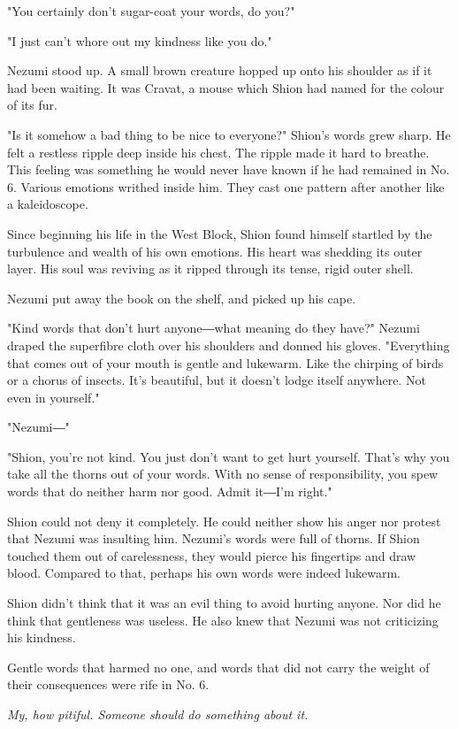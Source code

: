 "You certainly don't sugar-coat your words, do you?"

"I just can't whore out my kindness like you do."

Nezumi stood up. A small brown creature hopped up onto his shoulder as
if it had been waiting. It was Cravat, a mouse which Shion had named for
the colour of its fur.

"Is it somehow a bad thing to be nice to everyone?" Shion's words grew
sharp. He felt a restless ripple deep inside his chest. The ripple made
it hard to breathe. This feeling was something he would never have known
if he had remained in No. 6. Various emotions writhed inside him. They
cast one pattern after another like a kaleidoscope.

Since beginning his life in the West Block, Shion found himself startled
by the turbulence and wealth of his own emotions. His heart was shedding
its outer layer. His soul was reviving as it ripped through its tense,
rigid outer shell.

Nezumi put away the book on the shelf, and picked up his cape.

"Kind words that don't hurt anyone―what meaning do they have?" Nezumi
draped the superfibre cloth over his shoulders and donned his gloves.
"Everything that comes out of your mouth is gentle and lukewarm. Like
the chirping of birds or a chorus of insects. It's beautiful, but it
doesn't lodge itself anywhere. Not even in yourself."

"Nezumi―"

"Shion, you're not kind. You just don't want to get hurt yourself.
That's why you take all the thorns out of your words. With no sense of
responsibility, you spew words that do neither harm nor good. Admit
it―I'm right."

Shion could not deny it completely. He could neither show his anger nor
protest that Nezumi was insulting him. Nezumi's words were full of
thorns. If Shion touched them out of carelessness, they would pierce his
fingertips and draw blood. Compared to that, perhaps his own words were
indeed lukewarm.

Shion didn't think that it was an evil thing to avoid hurting anyone.
Nor did he think that gentleness was useless. He also knew that Nezumi
was not criticizing his kindness.

Gentle words that harmed no one, and words that did not carry the weight
of their consequences were rife in No. 6.

\emph{My, how pitiful. Someone should do something about it.}

